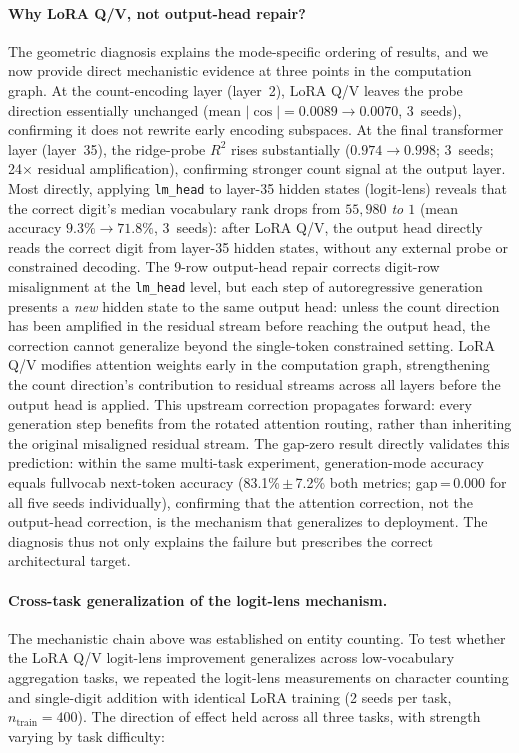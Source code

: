 \documentclass{article}
\begin{document}
\paragraph{Why LoRA Q/V, not output-head repair?}
The geometric diagnosis explains the mode-specific ordering of results, and we now provide
direct mechanistic evidence at three points in the computation graph.
At the count-encoding layer (layer~2), LoRA Q/V leaves the probe direction essentially
unchanged (mean $|\cos| = 0.0089 \to 0.0070$, 3~seeds), confirming it does not rewrite
early encoding subspaces.
At the final transformer layer (layer~35), the ridge-probe $R^2$ rises substantially
($0.974 \to 0.998$; 3~seeds; 24$\times$ residual amplification), confirming stronger
count signal at the output layer.
Most directly, applying \texttt{lm\_head} to layer-35 hidden states (logit-lens) reveals
that the correct digit's median vocabulary rank drops from
\emph{$55{,}980$ to $1$} (mean accuracy $9.3\% \to 71.8\%$, 3~seeds):
after LoRA Q/V, the output head directly reads the correct digit from layer-35 hidden
states, without any external probe or constrained decoding.
The 9-row output-head repair corrects digit-row misalignment at the \texttt{lm\_head} level, but each step of autoregressive generation presents a \emph{new} hidden state to the same output head: unless the count direction has been amplified in the residual stream before reaching the output head, the correction cannot generalize beyond the single-token constrained setting.
LoRA Q/V modifies attention weights early in the computation graph, strengthening the count direction's contribution to residual streams across all layers before the output head is applied.
This upstream correction propagates forward: every generation step benefits from the rotated attention routing, rather than inheriting the original misaligned residual stream.
The gap-zero result directly validates this prediction: within the same multi-task
experiment, generation-mode accuracy equals fullvocab next-token accuracy
(83.1\%\,$\pm$\,7.2\% both metrics; gap\,=\,0.000 for all five seeds individually),
confirming that the attention correction, not the output-head correction, is the
mechanism that generalizes to deployment.
The diagnosis thus not only explains the failure but prescribes the correct architectural target.

\paragraph{Cross-task generalization of the logit-lens mechanism.}
The mechanistic chain above was established on entity counting.
To test whether the LoRA Q/V logit-lens improvement generalizes across low-vocabulary
aggregation tasks, we repeated the logit-lens measurements on character counting and
single-digit addition with identical LoRA training (2 seeds per task, $n_{\text{train}}{=}400$).
The direction of effect held across all three tasks, with strength varying by task
difficulty:
\end{document}
